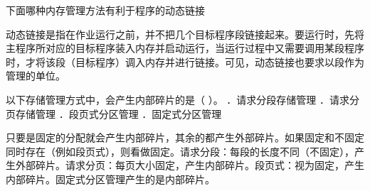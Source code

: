 \question 下面哪种内存管理方法有利于程序的动态链接
\par{}
\begin{solution}动态链接是指在作业运行之前，并不把几个目标程序段链接起来。要运行时，先将主程序所对应的目标程序装入内存并启动运行，当运行过程中又需要调用某段程序时，才将该段（目标程序）调入内存并进行链接。可见，动态链接也要求以段作为管理的单位。
\end{solution}
\question 以下存储管理方式中，会产生内部碎片的是（ ）。 ．请求分段存储管理
．请求分页存储管理 ．段页式分区管理 ．固定式分区管理
\par{}
\begin{solution}只要是固定的分配就会产生内部碎片，其余的都产生外部碎片。如果固定和不固定同时存在（例如段页式），则看做固定。请求分段：每段的长度不同（不固定），产生外部碎片。请求分页：每页大小固定，产生内部碎片。段页式：视为固定，产生内部碎片。固定式分区管理产生的是内部碎片。
\end{solution}
